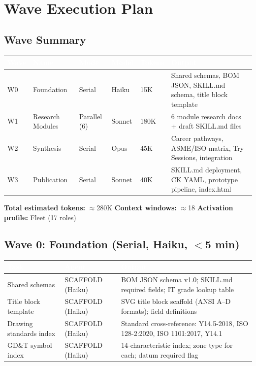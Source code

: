 \documentclass[11pt,letterpaper]{article}
\newcommand{\tableheader}[1]{\textbf{\sffamily\textcolor{white}{#1}}}
\begin{document}
\section{Wave Execution Plan}

\subsection{Wave Summary}

\begin{center}
\begin{tabularx}{\textwidth}{C{1.2cm}L{3cm}C{2cm}C{1.8cm}C{1.8cm}X}
\toprule
{}
\tableheader{Wave} & \tableheader{Name} & \tableheader{Mode} & \tableheader{Model} & \tableheader{Tokens} & \tableheader{Output} \\
\midrule
W0 & Foundation & Serial & Haiku & 15K & Shared schemas, BOM JSON, SKILL.md schema, title block template \\
W1 & Research Modules & Parallel (6) & Sonnet & 180K & 6 module research docs + draft SKILL.md files \\
W2 & Synthesis & Serial & Opus & 45K & Career pathways, ASME/ISO matrix, Try Sessions, integration \\
W3 & Publication & Serial & Sonnet & 40K & SKILL.md deployment, CK YAML, prototype pipeline, index.html \\
\bottomrule
\end{tabularx}
\end{center}

\textbf{Total estimated tokens:} $\approx$280K \quad \textbf{Context windows:} $\approx$18 \quad \textbf{Activation profile:} Fleet (17 roles)

\subsection{Wave 0: Foundation (Serial, Haiku, $<$5 min)}

\begin{center}
\begin{tabularx}{\textwidth}{L{3.5cm}L{3cm}X}
\toprule
{}
\tableheader{Task} & \tableheader{Agent} & \tableheader{Output} \\
\midrule
Shared schemas & SCAFFOLD (Haiku) & BOM JSON schema v1.0; SKILL.md required fields; IT grade lookup table \\
Title block template & SCAFFOLD (Haiku) & SVG title block scaffold (ANSI A--D formats); field definitions \\
Drawing standards index & SCAFFOLD (Haiku) & Standard cross-reference: Y14.5-2018, ISO 128-2:2020, ISO 1101:2017, Y14.1 \\
GD\&T symbol index & SCAFFOLD (Haiku) & 14-characteristic index; zone type for each; datum required flag \\
\bottomrule
\end{tabularx}
\end{center}
\end{document}
